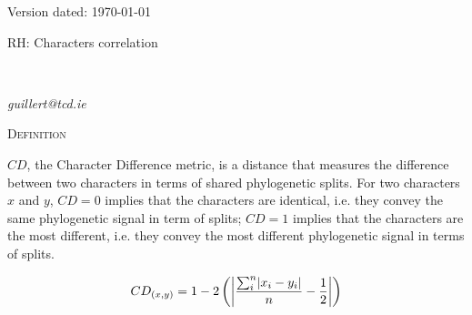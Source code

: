 \documentclass[12pt,letterpaper]{article}
\DeclarePairedDelimiter\abs{\lvert}{\rvert}%
\renewcommand{\section}[1]{%
\bigskip
\begin{center}
\begin{Large}
\normalfont\scshape #1
\medskip
\end{Large}
\end{center}}
\begin{document}
\begin{flushright}
Version dated: \today
\end{flushright}
\bigskip
\noindent RH: Characters correlation

\bigskip
\medskip
\begin{center}


\bigskip


\bigskip

\\

\end{center}
\medskip
{} \textit{guillert@tcd.ie}\\ 
\vspace{1in}

\newpage

\section{Definition}

$CD$, the Character Difference metric, is a distance that measures the difference between two characters in terms of shared phylogenetic splits.
For two characters $x$ and $y$, $CD=0$ implies that the characters are identical, i.e. they convey the same phylogenetic signal in term of splits; $CD=1$ implies that the characters are the most different, i.e. they convey the most different phylogenetic signal in terms of splits.


\begin{equation}
    CD_{(x,y)} = 1 - 2\left(\abs*{\frac{\sum_{i}^{n}\abs{x_{i} - y_{i}}}{n}-\frac{1}{2}}\right)
\end{equation}
\end{document}
